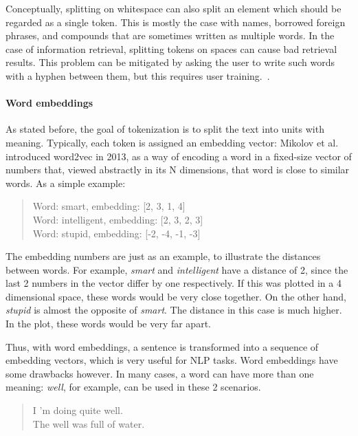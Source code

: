 Conceptually, splitting on whitespace can also split an element which should be regarded as a single token. This is mostly the case with names, borrowed foreign phrases, and compounds that are sometimes written as multiple words. In the case of information retrieval, splitting tokens on spaces can cause bad retrieval results. This problem can be mitigated by asking the user to write such words with a hyphen between them, but this requires user training.~\cite{manning2008introduction}.

\paragraph{Word embeddings}

As stated before, the goal of tokenization is to split the text into units with meaning. Typically, each token is assigned an embedding vector: Mikolov et al. \cite{mikolov2013efficient} introduced word2vec in 2013, as a way of encoding a word in a fixed-size vector of numbers that, viewed abstractly in its N dimensions, that word is close to similar words. As a simple example: 

\begin{quote}
    Word: smart, embedding: [2, 3, 1, 4]\\
    Word: intelligent, embedding: [2, 3, 2, 3]\\
    Word: stupid, embedding: [-2, -4, -1, -3]
\end{quote}

The embedding numbers are just as an example, to illustrate the distances between words. For example, \emph{smart} and \emph{intelligent} have a distance of 2, since the last 2 numbers in the vector differ by one respectively. If this was plotted in a 4 dimensional space, these words would be very close together. On the other hand, \emph{stupid} is almost the opposite of \emph{smart}. The distance in this case is much higher. In the plot, these words would be very far apart.

Thus, with word embeddings, a sentence is transformed into a sequence of embedding vectors, which is very useful for NLP tasks. Word embeddings have some drawbacks however. In many cases, a word can have more than one meaning: \emph{well}, for example, can be used in these 2 scenarios.

\begin{quote}
    I 'm doing quite well.\\
    The well was full of water.
\end{quote}

